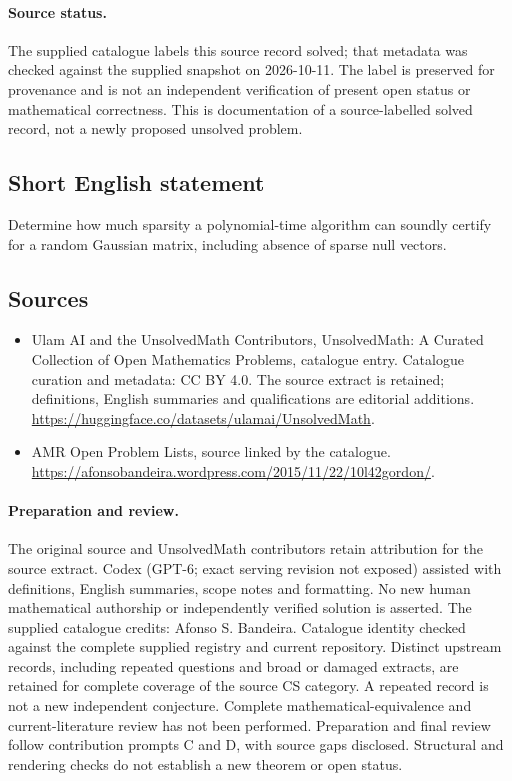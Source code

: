 \documentclass[11pt]{article}
\begin{document}
\paragraph{Source status.}
The supplied catalogue labels this source record solved; that metadata was checked against the supplied snapshot on 2026-10-11. The label is preserved for provenance and is not an independent verification of present open status or mathematical correctness. This is documentation of a source-labelled solved record, not a newly proposed unsolved problem.
\subsection{Short English statement}
Determine how much sparsity a polynomial-time algorithm can soundly certify for a random Gaussian matrix, including absence of sparse null vectors.
\subsection{Sources}
\begin{itemize}
\item[\hypertarget{source:statement:1}{S1}] Ulam AI and the UnsolvedMath Contributors, UnsolvedMath: A Curated Collection of Open Mathematics Problems, catalogue entry. Catalogue curation and metadata: CC BY 4.0. The source extract is retained; definitions, English summaries and qualifications are editorial additions.
\url{https://huggingface.co/datasets/ulamai/UnsolvedMath}.
\item[\hypertarget{source:statement:2}{S2}] AMR Open Problem Lists, source linked by the catalogue.
\url{https://afonsobandeira.wordpress.com/2015/11/22/10l42gordon/}.
\end{itemize}
\paragraph{Preparation and review.}
The original source and UnsolvedMath contributors retain attribution for the source extract. Codex (GPT-6; exact serving revision not exposed) assisted with definitions, English summaries, scope notes and formatting. No new human mathematical authorship or independently verified solution is asserted. The supplied catalogue credits: Afonso S. Bandeira. Catalogue identity checked against the complete supplied registry and current repository. Distinct upstream records, including repeated questions and broad or damaged extracts, are retained for complete coverage of the source CS category. A repeated record is not a new independent conjecture. Complete mathematical-equivalence and current-literature review has not been performed. Preparation and final review follow contribution prompts C and D, with source gaps disclosed. Structural and rendering checks do not establish a new theorem or open status.
\label{end:statement}
\end{document}
